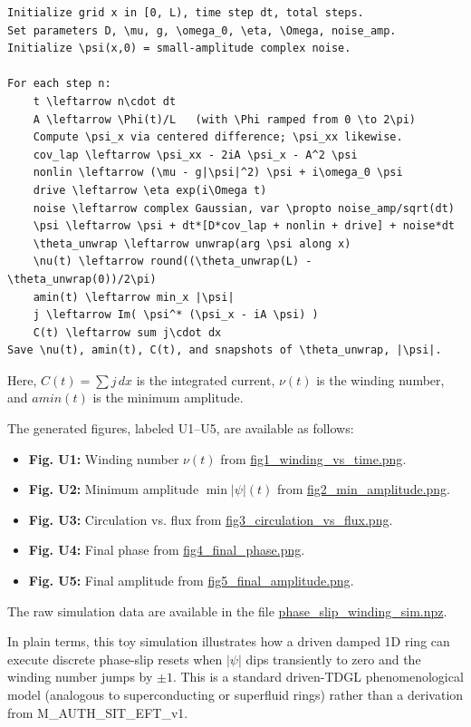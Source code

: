 \documentclass[american,11pt,letterpaper]{article}
\def\texttt#1{#1}%
\begin{document}
\begin{verbatim}
Initialize grid x in [0, L), time step dt, total steps.
Set parameters D, \mu, g, \omega_0, \eta, \Omega, noise_amp.
Initialize \psi(x,0) = small-amplitude complex noise.

For each step n:
    t \leftarrow n\cdot dt
    A \leftarrow \Phi(t)/L   (with \Phi ramped from 0 \to 2\pi)
    Compute \psi_x via centered difference; \psi_xx likewise.
    cov_lap \leftarrow \psi_xx - 2iA \psi_x - A^2 \psi
    nonlin \leftarrow (\mu - g|\psi|^2) \psi + i\omega_0 \psi
    drive \leftarrow \eta exp(i\Omega t)
    noise \leftarrow complex Gaussian, var \propto noise_amp/sqrt(dt)
    \psi \leftarrow \psi + dt*[D*cov_lap + nonlin + drive] + noise*dt
    \theta_unwrap \leftarrow unwrap(arg \psi along x)
    \nu(t) \leftarrow round((\theta_unwrap(L) - \theta_unwrap(0))/2\pi)
    amin(t) \leftarrow min_x |\psi|
    j \leftarrow Im( \psi^* (\psi_x - iA \psi) )
    C(t) \leftarrow sum j\cdot dx
Save \nu(t), amin(t), C(t), and snapshots of \theta_unwrap, |\psi|.
\end{verbatim}

Here, $C(t) = \sum j\, dx$ is the integrated current, $\nu(t)$ is the winding number, and $amin(t)$ is the minimum amplitude.

The generated figures, labeled U1--U5, are available as follows:
\begin{itemize}
    \item \textbf{Fig. U1:} Winding number \(\nu(t)\) from \url{fig1_winding_vs_time.png}.
    \item \textbf{Fig. U2:} Minimum amplitude \(\min|\psi|(t)\) from \url{fig2_min_amplitude.png}.
    \item \textbf{Fig. U3:} Circulation vs. flux from \url{fig3_circulation_vs_flux.png}.
    \item \textbf{Fig. U4:} Final phase from \url{fig4_final_phase.png}.
    \item \textbf{Fig. U5:} Final amplitude from \url{fig5_final_amplitude.png}.
\end{itemize}
The raw simulation data are available in the file \url{phase_slip_winding_sim.npz}.

In plain terms, this toy simulation illustrates how a driven damped 1D ring can execute discrete phase-slip resets when $|\psi|$ dips transiently to zero and the winding number jumps by $\pm 1$. This is a standard driven-TDGL phenomenological model (analogous to superconducting or superfluid rings) rather than a derivation from \texttt{M\_AUTH\_SIT\_EFT\_v1}.
\end{document}
